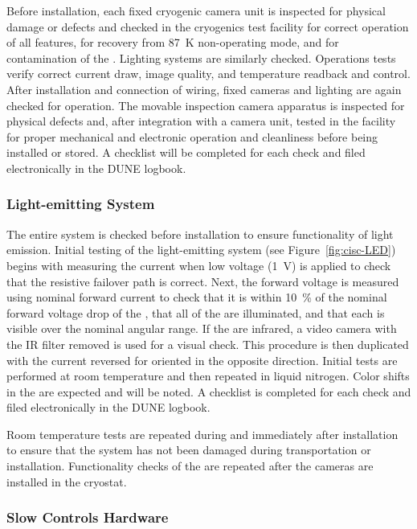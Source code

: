 Before installation, each fixed cryogenic camera unit is inspected for physical damage or defects and checked in the cryogenics test facility  for correct operation of all features, for recovery from \SI{87}{K} non-operating mode, and for contamination of the \lar{}. Lighting systems are similarly checked. Operations tests verify correct current draw, image quality, and temperature readback and control. After installation and connection of wiring, fixed cameras and lighting are again  checked for operation. The movable inspection camera apparatus is inspected for physical defects and, after integration with a camera unit, tested in the facility for proper mechanical and electronic operation and cleanliness before being installed or stored. A checklist will be completed for each  check and filed electronically in the DUNE logbook. 

\subsubsection{Light-emitting System}
\label{sec:fdgen-slow-cryo-qc-les}

The entire system is checked before installation to ensure functionality of light emission. 
Initial testing of the light-emitting system (see Figure~\ref{fig:cisc-LED}) begins with
measuring the current when low voltage (\SI{1}{V}) is applied to check
that the resistive  failover path is correct. Next, the forward voltage is measured using nominal forward current to
check that it is within \SI{10}{\%} of the nominal forward voltage drop of
the , that all of the  are illuminated, and that each  is visible over the nominal angular range. If the  are
infrared, a video camera with the IR filter removed is used for a
visual check. This procedure is then duplicated with the current
reversed for  oriented in the opposite direction. Initial tests are performed at room temperature and then repeated in liquid nitrogen. Color shifts in the  are expected and will be noted. A checklist is completed for each  check and filed electronically in the DUNE logbook.

Room temperature tests are repeated during and immediately after installation to ensure that the system has not been damaged during transportation or installation. Functionality checks of the  are repeated after the cameras are installed in the cryostat.

\subsubsection{Slow Controls Hardware}
\label{sec:fdsp-slow-cryo-qc-sc-hard}

